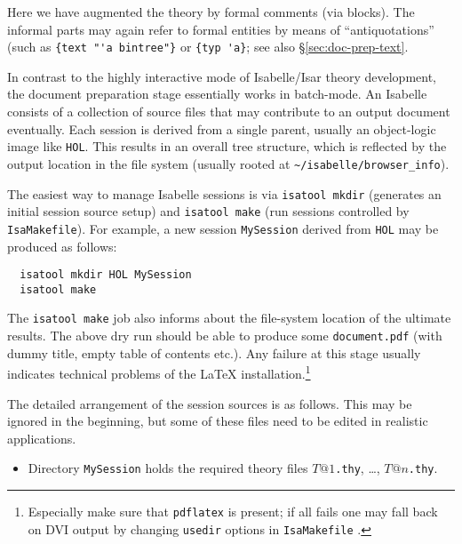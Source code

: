 \begin{isabellebody}
\begin{isamarkuptext}
  Here we have augmented the theory by formal comments (via
   blocks).  The informal parts may again refer to
  formal entities by means of ``antiquotations'' (such as
  \texttt{\at}\verb,{text "'a bintree"}, or
  \texttt{\at}\verb,{typ 'a},; see also \S\ref{sec:doc-prep-text}.%
\end{isamarkuptext}%
\isamarkuptrue%
%
\isamarkuptrue%
%
\begin{isamarkuptext}%
In contrast to the highly interactive mode of Isabelle/Isar theory
  development, the document preparation stage essentially works in
  batch-mode.  An Isabelle  consists of a collection
  of source files that may contribute to an output document
  eventually.  Each session is derived from a single parent, usually
  an object-logic image like \texttt{HOL}.  This results in an overall
  tree structure, which is reflected by the output location in the
  file system (usually rooted at \verb,~/isabelle/browser_info,).

  \medskip The easiest way to manage Isabelle sessions is via
  \texttt{isatool mkdir} (generates an initial session source setup)
  and \texttt{isatool make} (run sessions controlled by
  \texttt{IsaMakefile}).  For example, a new session
  \texttt{MySession} derived from \texttt{HOL} may be produced as
  follows:

\begin{verbatim}
  isatool mkdir HOL MySession
  isatool make
\end{verbatim}

  The \texttt{isatool make} job also informs about the file-system
  location of the ultimate results.  The above dry run should be able
  to produce some \texttt{document.pdf} (with dummy title, empty table
  of contents etc.).  Any failure at this stage usually indicates
  technical problems of the {\LaTeX} installation.\footnote{Especially
  make sure that \texttt{pdflatex} is present; if all fails one may
  fall back on DVI output by changing \texttt{usedir} options in
  \texttt{IsaMakefile} \cite{isabelle-sys}.}

  \medskip The detailed arrangement of the session sources is as
  follows.  This may be ignored in the beginning, but some of these
  files need to be edited in realistic applications.

  \begin{itemize}

  \item Directory \texttt{MySession} holds the required theory files
  $T@1$\texttt{.thy}, \dots, $T@n$\texttt{.thy}.


\end{itemize}
\end{isamarkuptext}
\end{isabellebody}
